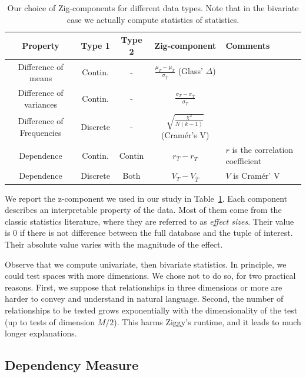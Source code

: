 \begin{table}[t!]
    \centering
    \begin{tabular}{|c|c|c|c|l|}
      \hline
      Property & Type 1 & Type 2 & Zig-component & Comments\\
      \hline
      Difference of means        & Contin.  & - &
        $\frac{\mu_T - \mu_{\overline{T}}}{ \sigma_{\overline{T}}}$ (Glass'
        $\Delta$) &  \\
    Difference of variances    & Contin.  & - &
        $ \frac{\sigma_T - \sigma_{\overline{T}}}{ \sigma_{\overline{T}}}$ & \\
    Difference of Frequencies & Discrete & - & 
        $\sqrt{\frac{\chi^2}{N(k - 1)}}$ (Cram\'er's V) & \\
      \hline
      Dependence  & Contin. & Contin & $ r_T - r_{\overline{T}} $ & $r$ is the
      correlation coefficient\\
      Dependence  & Discrete & Both & $ V_T - V_{\overline{T}} $ & $V$ is
      Cram\'er' V\\
      \hline
    \end{tabular}
\caption{Our choice of Zig-components for different data types. Note that in
the bivariate case we actually compute statistics of statistics.}
    \label{tab:dissim}
\end{table}

We report the z-component we used in our study in Table~\ref{tab:dissim}.  Each
component describes an interpretable property of the data.  Most of them come
from the classic statistics literature, where they are referred to as
\emph{effect sizes}. Their value is 0 if there is not difference between the
full database and the tuple of interest. Their absolute value varies with the
magnitude of the effect.

Observe that we compute univariate, then bivariate statistics. In principle, we
could test spaces with more dimensions. We chose not to do so, for two
practical reasons. First, we suppose that relationships in three dimensions or
more are harder to convey and understand in natural language.  Second, the
number of relationships to be tested grows exponentially with the
dimensionality of the test (up to tests of dimension $M/2$). This harms Ziggy's
runtime, and it leads to much longer explanations.


\subsection{Dependency Measure}
\label{sec:dependency}


